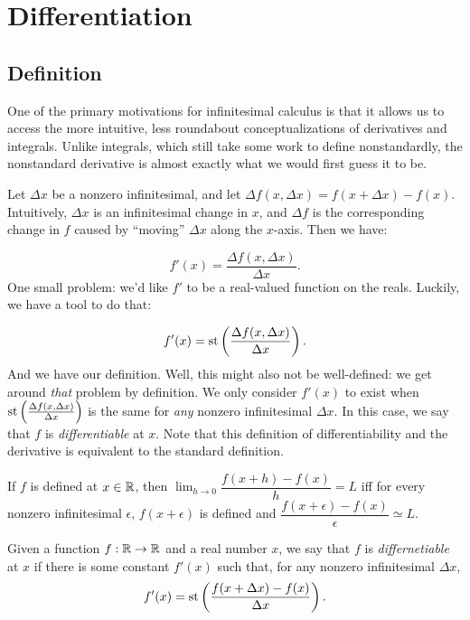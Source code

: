 \section{Differentiation}
\subsection{Definition}
One of the primary motivations for infinitesimal calculus is that it allows us to access the more intuitive, less roundabout conceptualizations of derivatives and integrals. Unlike integrals, which still take some work to define nonstandardly, the nonstandard derivative is almost exactly what we would first guess it to be.

Let $\Delta x$ be a nonzero infinitesimal, and let $\Delta f (x, \Delta x) = f(x + \Delta x) - f(x)$. Intuitively, $\Delta x$ is an infinitesimal change in $x$, and $\Delta f$ is the corresponding change in $f$ caused by ``moving'' $\Delta x$ along the $x$-axis. Then we have:

\[ f'(x) = \frac{\Delta f(x, \Delta x)}{\Delta x}. \]
One small problem: we'd like $f'$ to be a real-valued function on the reals. Luckily, we have a tool to do that:

\[ f'(x) = \operatorname{st}\left(\frac{\Delta f(x, \Delta x)}{\Delta x}\right). \]
And we have our definition. Well, this might also not be well-defined: we get around \textit{that} problem by definition. We only consider $f'(x)$ to exist when $\operatorname{st}\left(\frac{\Delta f(x, \Delta x)}{\Delta x}\right)$ is the same for \textit{any} nonzero infinitesimal $\Delta x$. In this case, we say that $f$ is \textit{differentiable} at $x$. Note that this definition of differentiability and the derivative is equivalent to the standard definition.

\begin{thm}\label{nonStandardDerivEquivalent}
    If $f$ is defined at $x \in \mathbb{R}$, then $\displaystyle{\lim_{h\to 0}} \dfrac{f(x + h) - f(x)}{h} = L$ iff for every nonzero infinitesimal $\epsilon$, $f(x + \epsilon)$ is defined and $\dfrac{f(x + \epsilon) - f(x)}{\epsilon} \simeq L$.
\end{thm}

\begin{defn}
    Given a function $f: \mathbb{R} \to \mathbb{R}$ and a real number $x$, we say that $f$ is \textit{differnetiable} at $x$ if there is some constant $f'(x)$ such that, for any nonzero infinitesimal $\Delta x$,
    \[f'(x) = \operatorname{st}\left(\frac{f(x + \Delta x) - f(x)}{\Delta x}\right).\]
\end{defn}

